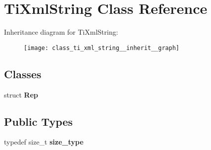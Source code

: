 \hypertarget{class_ti_xml_string}{\section{\-Ti\-Xml\-String \-Class \-Reference}
\label{class_ti_xml_string}
}


\-Inheritance diagram for \-Ti\-Xml\-String\-:
\nopagebreak
\begin{figure}[H]
\begin{center}
\leavevmode
\texttt{[image: class\_ti\_xml\_string\_\_inherit\_\_graph]}
\end{center}
\end{figure}
\subsection*{\-Classes}
\begin{DoxyCompactItemize}
\item 
struct {\bfseries \-Rep}
\end{DoxyCompactItemize}
\subsection*{\-Public \-Types}
\begin{DoxyCompactItemize}
\item 
\hypertarget{class_ti_xml_string_abeb2c1893a04c17904f7c06546d0b971}{typedef size\-\_\-t {\bfseries size\-\_\-type}}\label{class_ti_xml_string_abeb2c1893a04c17904f7c06546d0b971}

\end{DoxyCompactItemize}
